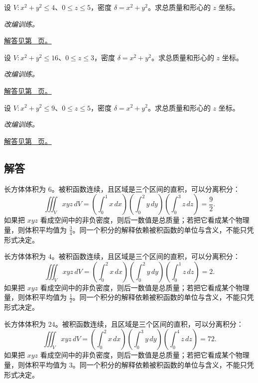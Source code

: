 \documentclass[UTF8,12pt,a4paper,fontset=fandol]{ctexart}
\begin{document}
\begin{example}[圆柱体内的径向质量]\label{ex:c38q22}
设 $V:x^2+y^2\le 4$、$0\le z\le 5$，密度 $\delta=x^2+y^2$。求总质量和形心的 $z$ 坐标。
\par\textit{改编训练。}\par\hyperref[ans:c38q22]{解答见第~\pageref{ans:c38q22} 页。}
\end{example}
\begin{example}[圆柱体内的径向质量]\label{ex:c38q23}
设 $V:x^2+y^2\le 16$、$0\le z\le 3$，密度 $\delta=x^2+y^2$。求总质量和形心的 $z$ 坐标。
\par\textit{改编训练。}\par\hyperref[ans:c38q23]{解答见第~\pageref{ans:c38q23} 页。}
\end{example}
\begin{example}[圆柱体内的径向质量]\label{ex:c38q24}
设 $V:x^2+y^2\le 9$、$0\le z\le 5$，密度 $\delta=x^2+y^2$。求总质量和形心的 $z$ 坐标。
\par\textit{改编训练。}\par\hyperref[ans:c38q24]{解答见第~\pageref{ans:c38q24} 页。}
\end{example}
\subsection{解答}
\begin{solve}\label{ans:c38q1}
长方体体积为 $6$。被积函数连续，且区域是三个区间的直积，可以分离积分：
\[
\iiint_Vxyz\,dV=\left(\int_0^{1}x\,dx\right)\left(\int_0^{2}y\,dy\right)\left(\int_0^{3}z\,dz\right)=\frac{9}{2}.
\]
如果把 $xyz$ 看成空间中的非负密度，则后一数值是总质量；若把它看成某个物理量，则体积平均值为 $\frac{3}{4}$。同一个积分的解释依赖被积函数的单位与含义，不能只凭形式决定。
\end{solve}

\begin{solve}\label{ans:c38q2}
长方体体积为 $4$。被积函数连续，且区域是三个区间的直积，可以分离积分：
\[
\iiint_Vxyz\,dV=\left(\int_0^{2}x\,dx\right)\left(\int_0^{2}y\,dy\right)\left(\int_0^{1}z\,dz\right)=2.
\]
如果把 $xyz$ 看成空间中的非负密度，则后一数值是总质量；若把它看成某个物理量，则体积平均值为 $\frac{1}{2}$。同一个积分的解释依赖被积函数的单位与含义，不能只凭形式决定。
\end{solve}

\begin{solve}\label{ans:c38q3}
长方体体积为 $24$。被积函数连续，且区域是三个区间的直积，可以分离积分：
\[
\iiint_Vxyz\,dV=\left(\int_0^{2}x\,dx\right)\left(\int_0^{3}y\,dy\right)\left(\int_0^{4}z\,dz\right)=72.
\]
如果把 $xyz$ 看成空间中的非负密度，则后一数值是总质量；若把它看成某个物理量，则体积平均值为 $3$。同一个积分的解释依赖被积函数的单位与含义，不能只凭形式决定。
\end{solve}
\end{document}
